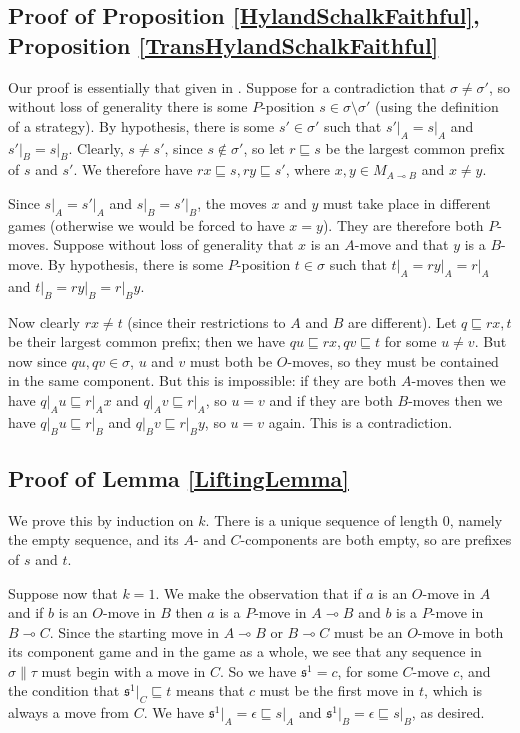 \documentclass[11pt]{article} %
\theoremstyle{plain} %
\theoremstyle{definition} %
\theoremstyle{note}
\theoremstyle{exercisestyle}
\renewcommand{\implies}{\multimap}
\newcommand{\s}{\mathfrak s}
\newcommand{\emptyplay}{\epsilon}
\newcommand{\prefix}{\sqsubseteq}
\begin{document}
\subsection{Proof of Proposition \ref{HylandSchalkFaithful}, Proposition \ref{TransHylandSchalkFaithful}}
\label{HylandSchalkFaithfulProof}

Our proof is essentially that given in \cite{CalderonMcCusker}.  Suppose for a contradiction that $\sigma\ne\sigma'$, so without loss of generality there is some $P$-position $s\in\sigma\setminus\sigma'$ (using the definition of a strategy).  By hypothesis, there is some $s'\in\sigma'$ such that $s'\vert_A=s\vert_A$ and $s'\vert_B=s\vert_B$.  Clearly, $s\ne s'$, since $s\not\in\sigma'$, so let $r\prefix s$ be the largest common prefix of $s$ and $s'$.  We therefore have $rx\prefix s,ry\prefix s'$, where $x,y\in M_{A\implies B}$ and $x\ne y$.  

Since $s\vert_A=s'\vert_A$ and $s\vert_B=s'\vert_B$, the moves $x$ and $y$ must take place in different games (otherwise we would be forced to have $x=y$).  They are therefore both $P$-moves.  Suppose without loss of generality that $x$ is an $A$-move and that $y$ is a $B$-move.  By hypothesis, there is some $P$-position $t\in\sigma$ such that $t\vert_A=ry\vert_A=r\vert_A$ and $t\vert_B=ry\vert_B=r\vert_By$.

Now clearly $rx\ne t$ (since their restrictions to $A$ and $B$ are different).  Let $q\prefix rx, t$ be their largest common prefix; then we have $qu\prefix rx, qv\prefix t$ for some $u\ne v$.  But now since $qu, qv\in\sigma$, $u$ and $v$ must both be $O$-moves, so they must be contained in the same component.  But this is impossible: if they are both $A$-moves then we have $q\vert_Au\prefix r\vert_A x$ and $q\vert_Av\prefix r\vert_A$, so $u=v$ and if they are both $B$-moves then we have $q\vert_Bu\prefix r\vert_B$ and $q\vert_Bv\prefix r\vert_By$, so $u=v$ again.  This is a contradiction.

\subsection{Proof of Lemma \ref{LiftingLemma}}
\label{LiftingLemmaProof}

We prove this by induction on $k$.  There is a unique sequence of length $0$, namely the empty sequence, and its $A$- and $C$-components are both empty, so are prefixes of $s$ and $t$.  

Suppose now that $k=1$.  We make the observation that if $a$ is an $O$-move in $A$ and if $b$ is an $O$-move in $B$ then $a$ is a $P$-move in $A\implies B$ and $b$ is a $P$-move in $B\implies C$.  Since the starting move in $A\implies B$ or $B\implies C$ must be an $O$-move in both its component game and in the game as a whole, we see that any sequence in $\sigma\|\tau$ must begin with a move in $C$.  So we have $\s^1=c$, for some $C$-move $c$, and the condition that $\s^1\vert_C\prefix t$ means that $c$ must be the first move in $t$, which is always a move from $C$.  We have $\s^1\vert_A=\emptyplay\prefix s\vert_A$ and $\s^1\vert_B=\emptyplay\prefix s\vert_B$, as desired.
\end{document}
